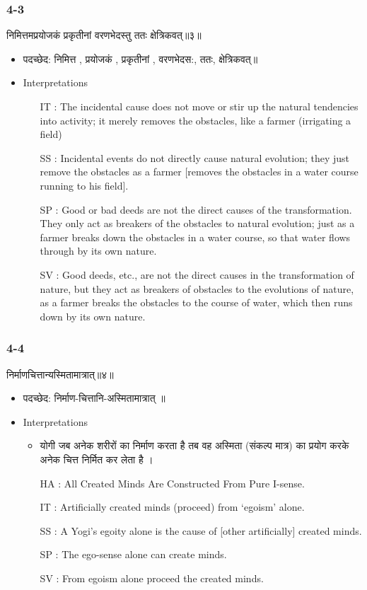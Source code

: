 \begin{frame}[fragile]\frametitle{4-3}
\begin{sanskrit}
निमित्तमप्रयोजकं प्रकृतीनां वरणभेदस्तु ततः क्षेत्रिकवत्॥३॥
\end{sanskrit}

	\begin{itemize}
	\item पदच्छेद:  निमित्त , प्रयोजकं‌ , प्रकृतीनां‌ , वरणभेदस:, ततः‌, क्षेत्रिकवत्‌॥
	\item Interpretations
		\begin{itemize}	
		\item [IT]: The incidental cause does not move or stir up the natural tendencies into activity; it merely removes the obstacles, like a farmer (irrigating a field)
		\item [SS]: Incidental events do not directly cause natural evolution; they just remove the obstacles as a farmer [removes the obstacles in a water course running to his field].
		\item [SP]: Good or bad deeds are not the direct causes of the transformation. They only act as breakers of the obstacles to natural evolution; just as a farmer breaks down the obstacles in a water course, so that water flows through by its own nature.
		\item [SV]: Good deeds, etc., are not the direct causes in the transformation of nature, but they act as breakers of obstacles to the evolutions of nature, as a farmer breaks the obstacles to the course of water, which then runs down by its own nature.
		\end{itemize}
	\end{itemize}
\end{frame}

\begin{frame}[fragile]\frametitle{4-4}
\begin{sanskrit}
निर्माणचित्तान्यस्मितामात्रात्॥४॥
\end{sanskrit}

	\begin{itemize}
	\item पदच्छेद:  ‌निर्माण-चित्तानि-अस्मितामात्रात् ॥
	\item Interpretations
		\begin{itemize}	
		\item योगी जब अनेक शरीरों का निर्माण करता है तब वह अस्मिता (संकल्प मात्र) का प्रयोग करके अनेक चित्त निर्मित कर लेता है ।
		\item [HA]: All Created Minds Are Constructed From Pure I-sense.
		\item [IT]: Artificially created minds (proceed) from ‘egoism’ alone.
		\item [SS]: A Yogi’s egoity alone is the cause of [other artificially] created minds.
		\item [SP]: The ego-sense alone can create minds.
		\item [SV]: From egoism alone proceed the created minds. 
		\end{itemize}
	\end{itemize}
\end{frame}


